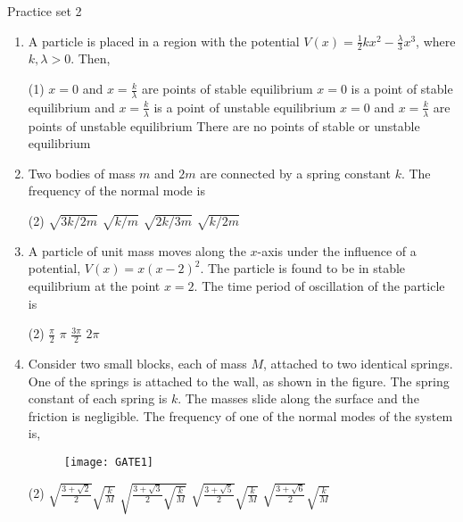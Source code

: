 \newpage
\begin{abox}
	Practice set 2 
	\end{abox}
\begin{enumerate}

	\item A particle is placed in a region with the potential $V(x)=\frac{1}{2} k x^{2}-\frac{\lambda}{3} x^{3}$, where $k, \lambda>0$.
	Then,
	{}
\begin{tasks}(1)
	\task[\textbf{A.}] $x=0$ and $x=\frac{k}{\lambda}$ are points of stable equilibrium
	\task[\textbf{B.}]$x=0$ is a point of stable equilibrium and $x=\frac{k}{\lambda}$ is a point of unstable equilibrium
	\task[\textbf{C.}]$x=0$ and $x=\frac{k}{\lambda}$ are points of unstable equilibrium
	\task[\textbf{D.}]There are no points of stable or unstable equilibrium
\end{tasks}

	\item Two bodies of mass $m$ and $2 m$ are connected by a spring constant $k$. The frequency of the normal mode is
	{}
\begin{tasks}(2)
	\task[\textbf{A.}] $\sqrt{3 k / 2 m}$
	\task[\textbf{B.}]$\sqrt{k / m}$
	\task[\textbf{C.}] $\sqrt{2 k / 3 m}$
	\task[\textbf{D.}]$\sqrt{k / 2 m}$
\end{tasks}
	\item A particle of unit mass moves along the $x$-axis under the influence of a potential, $V(x)=x(x-2)^{2}$. The particle is found to be in stable equilibrium at the point $x=2$. The time period of oscillation of the particle is
	{}
\begin{tasks}(2)
	\task[\textbf{A.}] $\frac{\pi}{2}$
	\task[\textbf{B.}]$\pi$
	\task[\textbf{C.}]$\frac{3 \pi}{2}$
	\task[\textbf{D.}]$2 \pi$
\end{tasks}

	\item Consider two small blocks, each of mass $M$, attached to two identical springs. One of the springs is attached to the wall, as shown in the figure. The spring constant of each spring is $k$. The masses slide along the surface and the friction is negligible. The frequency of one of the normal modes of the system is,
{	}
	\begin{figure}[H]
		\centering
		\texttt{[image: GATE1]}
	\end{figure}
\begin{tasks}(2)
	\task[\textbf{A.}] $\sqrt{\frac{3+\sqrt{2}}{2}} \sqrt{\frac{k}{M}}$
	\task[\textbf{B.}]$\sqrt{\frac{3+\sqrt{3}}{2} \sqrt{\frac{k}{M}}}$
	\task[\textbf{C.}]$\sqrt{\frac{3+\sqrt{5}}{2}} \sqrt{\frac{k}{M}}$
	\task[\textbf{D.}]$\sqrt{\frac{3+\sqrt{6}}{2}} \sqrt{\frac{k}{M}}$
\end{tasks}


\end{enumerate}
